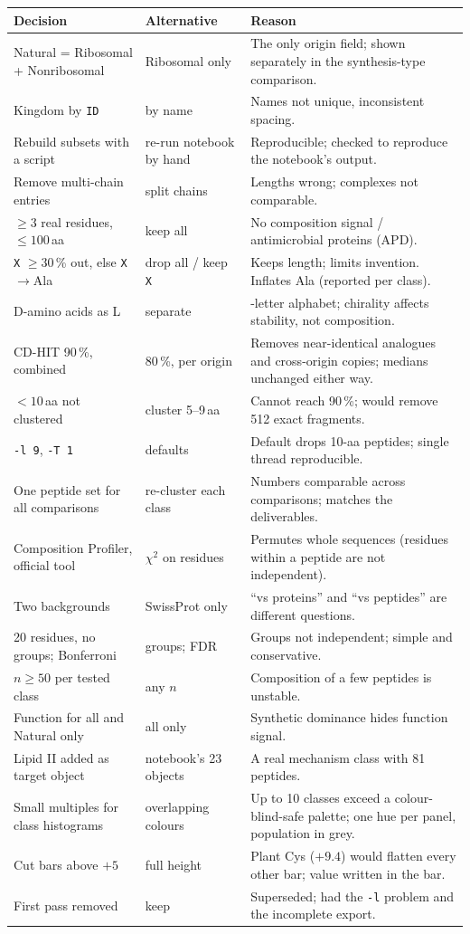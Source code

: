 \documentclass[11pt,a4paper]{article}
\newcommand{\amin}{\,aa}
\begin{document}
\begin{longtable}{>{\raggedright}p{4.2cm}>{\raggedright}p{4.2cm}>{\raggedright\arraybackslash}p{6.0cm}}
\toprule
Decision & Alternative & Reason\\\midrule\endhead
Natural = Ribosomal + Nonribosomal & Ribosomal only & The only origin field; shown separately in the synthesis-type comparison.\\
Kingdom by \texttt{ID} & by name & Names not unique, inconsistent spacing.\\
Rebuild subsets with a script & re-run notebook by hand & Reproducible; checked to reproduce the notebook's output.\\
Remove multi-chain entries & split chains & Lengths wrong; complexes not comparable.\\
$\geq3$ real residues, $\leq100$\amin & keep all & No composition signal / antimicrobial proteins (APD).\\
\texttt{X} $\geq30$\,\% out, else \texttt{X}$\rightarrow$Ala & drop all / keep \texttt{X} & Keeps length; limits invention. Inflates Ala (reported per class).\\
D-amino acids as L & separate & 20-letter alphabet; chirality affects stability, not composition.\\
CD-HIT 90\,\%, combined & 80\,\%, per origin & Removes near-identical analogues and cross-origin copies; medians unchanged either way.\\
$<10$\amin{} not clustered & cluster 5--9\amin & Cannot reach 90\,\%; would remove 512 exact fragments.\\
\texttt{-l 9}, \texttt{-T 1} & defaults & Default drops 10-aa peptides; single thread reproducible.\\
One peptide set for all comparisons & re-cluster each class & Numbers comparable across comparisons; matches the deliverables.\\
Composition Profiler, official tool & $\chi^2$ on residues & Permutes whole sequences (residues within a peptide are not independent).\\
Two backgrounds & SwissProt only & ``vs proteins'' and ``vs peptides'' are different questions.\\
20 residues, no groups; Bonferroni & groups; FDR & Groups not independent; simple and conservative.\\
$n\geq50$ per tested class & any $n$ & Composition of a few peptides is unstable.\\
Function for all and Natural only & all only & Synthetic dominance hides function signal.\\
Lipid II added as target object & notebook's 23 objects & A real mechanism class with 81 peptides.\\
Small multiples for class histograms & overlapping colours & Up to 10 classes exceed a colour-blind-safe palette; one hue per panel, population in grey.\\
Cut bars above $+5$ & full height & Plant Cys ($+9.4$) would flatten every other bar; value written in the bar.\\
First pass removed & keep & Superseded; had the \texttt{-l} problem and the incomplete export.\\\bottomrule
\end{longtable}
\end{document}
